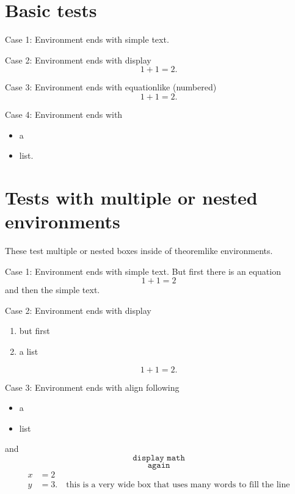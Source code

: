\documentclass[leqno]{article}
\begin{document}
\section{Basic tests}
\begin{theorem}
  Case 1: Environment ends with simple text.
\end{theorem}
\begin{theorem}
  Case 2: Environment ends with display
  \[
    1 + 1 = 2.
  \]
\end{theorem}
\begin{theorem}
  Case 3: Environment ends with equationlike (numbered)
  \begin{equation}
    1 + 1 = 2.
  \end{equation}
\end{theorem}
\begin{theorem}
  Case 4: Environment ends with
  \begin{itemize}
  \item a
  \item list.
  \end{itemize}
\end{theorem}



\section{Tests with multiple or nested environments}

These test multiple or nested boxes inside of theoremlike environments.

\begin{remark}
  Case 1: Environment ends with simple text.
  But first there is an equation
  \begin{equation}
    1+1 = 2
  \end{equation}
  and then the simple text.
\end{remark}
\begin{remark}
  Case 2: Environment ends with display
  \begin{enumerate}
  \item but first
  \item a list
  \end{enumerate}
  \[
    1 + 1 = 2.
  \]
\end{remark}
\begin{remark}
  Case 3: Environment ends with align
  following
  \begin{itemize}
  \item a
  \item list
  \end{itemize}
  and
  \[
    \texttt{ display math }
  \]
  \[
    \texttt{ again }
  \]
  \begin{align}
    x & = 2\\
    y & = 3. \quad \text{this is a very wide box that uses many words to fill the line}
  \end{align}
\end{remark}
\end{document}
